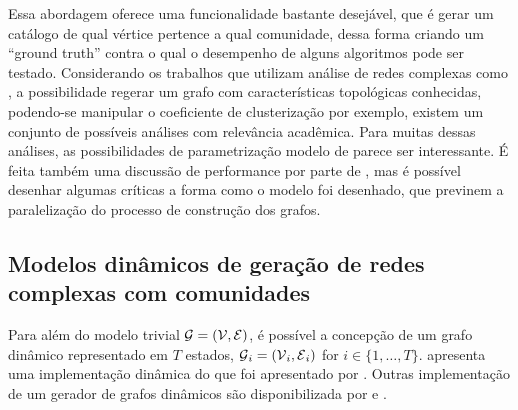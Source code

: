 \documentclass[notes.tex]{subfiles}
\begin{document}
Essa abordagem oferece uma funcionalidade bastante desejável, que é gerar um catálogo de qual vértice pertence a qual comunidade, dessa forma criando um ``ground truth'' contra o qual o desempenho de alguns algoritmos pode ser testado.
Considerando os trabalhos que utilizam análise de redes complexas como , a possibilidade regerar um grafo com características topológicas conhecidas, podendo-se manipular o coeficiente de clusterização por exemplo, existem um conjunto de possíveis análises com relevância acadêmica.
Para muitas dessas análises, as possibilidades de parametrização modelo de  parece ser interessante.
É feita também uma discussão de performance por parte de , mas é possível desenhar algumas críticas a forma como o modelo foi desenhado, que previnem a paralelização do processo de construção dos grafos.

\subsection{Modelos dinâmicos de geração de redes complexas com comunidades}

Para além do modelo trivial $\operatorname{\mathcal{G}} = (\operatorname{\mathcal{V}}, \operatorname{\mathcal{E}})$, é possível a concepção de um grafo dinâmico representado em $T$ estados,  $\operatorname{\mathcal{G}}_i = (\operatorname{\mathcal{V}}_i, \operatorname{\mathcal{E}}_i)$ for  $i \in \{1, \ldots, T\}$.
 apresenta uma implementação dinâmica do que foi apresentado por .
Outras implementação de um gerador de grafos dinâmicos são disponibilizada por  e .
\end{document}
